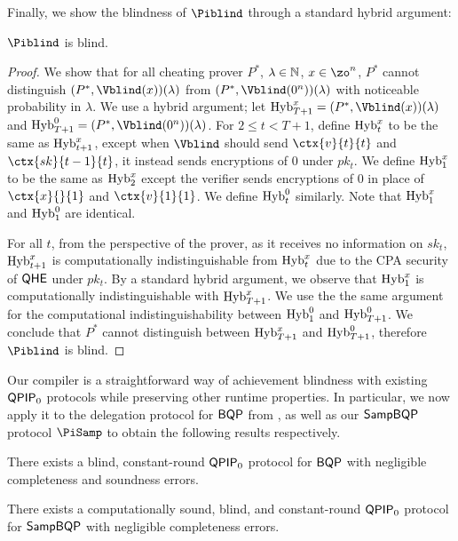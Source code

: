Finally, we show the blindness of $\Piblind$ through a standard hybrid argument:
\begin{theorem}
	$\Piblind$ is blind.
\end{theorem}
\begin{proof}
	We show that for all cheating prover $P^*$, $\lambda\in\mathbb{N}$, $x\in\zo^n$,
	$P^*$ cannot distinguish $(P^*, \Vblind(x))(\lambda)$ from $(P^*, \Vblind(0^n))(\lambda)$ with noticeable probability in $\lambda$.
	We use a hybrid argument; let $\Hyb_{T+1}^x=(P^*, \Vblind(x))(\lambda)$ and $\Hyb_{T+1}^0=(P^*, \Vblind(0^n))(\lambda)$.
	For $2\leq t<T+1$, define $\operatorname{Hyb}_t^x$ to be the same as $\operatorname{Hyb}_{t+1}^x$,
	except when $\Vblind$ should send $\ctx{v}{t}{t}$ and $\ctx{sk}{t-1}{t}$, it instead sends encryptions of $0$ under $pk_t$.
	We define $\operatorname{Hyb}_1^x$ to be the same as $\operatorname{Hyb}_2^x$ except the verifier sends encryptions of $0$ in place of $\ctx{x}{}{1}$ and $\ctx{v}{1}{1}$.
	We define $\operatorname{Hyb}_t^0$ similarly. Note that $\operatorname{Hyb}_1^x$ and $\operatorname{Hyb}_1^0$ are identical.

	For all $t$, from the perspective of the prover,
	as it receives no information on $sk_t$,
	$\operatorname{Hyb}_{t+1}^x$ is computationally indistinguishable from $\operatorname{Hyb}_t^x$ due to the CPA security of $\mathsf{QHE}$ under $pk_t$.
	By a standard hybrid argument, we observe that $\operatorname{Hyb}_1^x$ is computationally indistinguishable with $\operatorname{Hyb}_{T+1}^x$.
	We use the the same argument for the computational indistinguishability between $\operatorname{Hyb}_1^0$ and $\operatorname{Hyb}_{T+1}^0$.
	We conclude that $P^*$ cannot distinguish between $\operatorname{Hyb}_{T+1}^x$ and $\operatorname{Hyb}_{T+1}^0$,
	therefore $\Piblind$ is blind.
\end{proof}

Our compiler is a straightforward way of achievement blindness with existing $\operatorname{\mathsf{QPIP}}_0$ protocols while preserving other runtime properties.
In particular, we now apply it to the delegation protocol for $\operatorname{\mathsf{BQP}}$ from \cite{parallelrep, alagic2019twomessage},
as well as our $\operatorname{\mathsf{SampBQP}}$ protocol $\PiSamp$ to obtain the following results respectively.


\begin{theorem}
	There exists a blind, constant-round $\operatorname{\mathsf{QPIP}}_0$ protocol for $\operatorname{\mathsf{BQP}}$ with negligible completeness and soundness errors.
\end{theorem}

\begin{theorem}
	There exists a computationally sound, blind, and constant-round $\operatorname{\mathsf{QPIP}}_0$ protocol for $\operatorname{\mathsf{SampBQP}}$ with negligible completeness errors.
\end{theorem}
